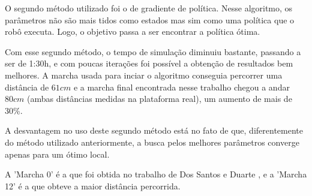 \documentclass[12pt]{report}
\begin{document}
O segundo método utilizado foi o de gradiente de política. Nesse algoritmo, os parâmetros não são mais tidos como estados mas sim como uma política que o robô executa. Logo, o objetivo passa a ser encontrar a política ótima. 

Com esse segundo método, o tempo de simulação diminuiu bastante, passando a ser de 1:30h, e com poucas iterações foi possível a obtenção de resultados bem melhores. A marcha usada para inciar o algoritmo conseguia percorrer uma distância de $61 cm$ e a marcha final encontrada nesse trabalho chegou a andar $80 cm$ (ambas distâncias medidas na plataforma real), um aumento de mais de 30\%.

A desvantagem no uso deste segundo método está no fato de que, diferentemente do método utilizado anteriormente, a busca pelos melhores parâmetros converge apenas para um ótimo local.

A 'Marcha 0' é a que foi obtida no trabalho de Dos Santos e Duarte \cite{2}, e a 'Marcha 12' é a que obteve a maior distância percorrida.



\end{document}

